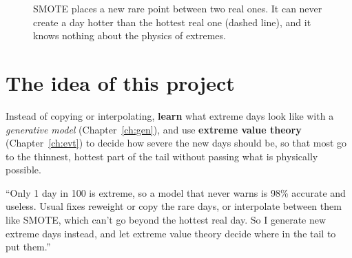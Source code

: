 \begin{figure}[H]
\centering
{}
\caption{SMOTE places a new rare point between two real ones. It can never create a day hotter than the hottest real
one (dashed line), and it knows nothing about the physics of extremes.}
\end{figure}

\section{The idea of this project}
Instead of copying or interpolating, \textbf{learn} what extreme days look like with a \emph{generative model}
(Chapter~\ref{ch:gen}), and use \textbf{extreme value theory} (Chapter~\ref{ch:evt}) to decide how severe the new days
should be, so that most go to the thinnest, hottest part of the tail without passing what is physically possible.

\begin{sayit}
``Only 1 day in 100 is extreme, so a model that never warns is 98\% accurate and useless. Usual fixes reweight or copy
the rare days, or interpolate between them like SMOTE, which can't go beyond the hottest real day. So I generate new
extreme days instead, and let extreme value theory decide where in the tail to put them.''
\end{sayit}
